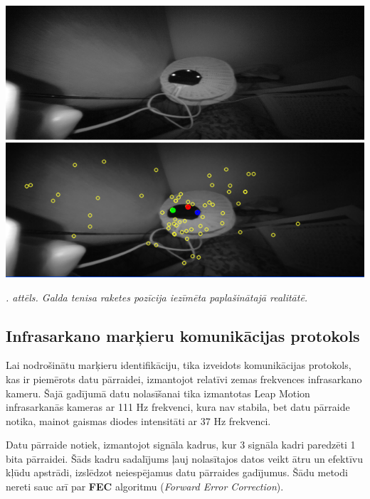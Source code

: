 \documentclass[12pt, a4paper, oneside, openright]{article}
\renewcommand{\thecimages}{\arabic{cimages}}
\begin{document}
\label{cimages:pong_raw_2.png}
\vspace{10pt}
\begin{samepage}
\begin{center}
\includegraphics[width=0.9\columnwidth]{images/pong_new_1.png}
\begin{center}
\footnotesize{
\textit{\thecimages. attēls. Galda tenisa raketes pozīcija iezīmēta paplašinātajā realitātē.}}
\end{center}
\end{center}
\end{samepage}

\newpage
\subsection{Infrasarkano marķieru komunikācijas protokols}\label{section_protocol}

\par
Lai nodrošinātu marķieru identifikāciju, tika izveidots komunikācijas protokols, kas ir piemērots
datu pārraidei, izmantojot relatīvi zemas frekvences infrasarkano kameru. Šajā gadījumā datu 
nolasīšanai tika izmantotas Leap Motion infrasarkanās kameras ar 111 Hz frekvenci, kura nav stabila,
bet datu pārraide notika, mainot gaismas diodes intensitāti ar 37 Hz frekvenci.


\par
Datu pārraide notiek, izmantojot signāla kadrus, kur 3 signāla kadri paredzēti 1 bita pārraidei. Šāds
kadru sadalījums ļauj nolasītajos datos veikt ātru un efektīvu kļūdu apstrādi, izslēdzot neiespējamus
datu pārraides gadījumus. Šādu metodi nereti sauc arī par \textbf{FEC} algoritmu (\textit{Forward Error Correction}).
\end{document}

